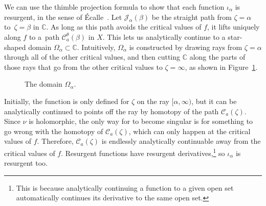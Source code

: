 \documentclass[pdftex]{sigma}
\newcommand{\C}{\mathbb{C}}
\numberwithin{equation}{section}
\begin{document}
\begin{Remark}
We can use the thimble projection formula to show that each function $\iota_\alpha$ is resurgent, in the sense of \'{E}calle~\cite[Section~1]{EcalleI}. Let $\mathcal{J}_\alpha(\beta)$ be the straight path from $\zeta = \alpha$ to~${\zeta = \beta}$ in $\C$. As long as this path avoids the critical values of $f$, it lifts uniquely along $f$ to a~path $\mathcal{C}_a^\theta(\beta)$ in $X$. This lets us analytically continue  to a star-shaped domain $\Omega_\alpha \subset \C$. Intuitively, $\Omega_\alpha$ is constructed by drawing rays from $\zeta = \alpha$ through all of the other critical values, and then cutting $\C$ along the parts of those rays that go from the other critical values to $\zeta = \infty$, as shown in Figure~\ref{Fig:slit domain}.
\begin{figure}[!ht]\centering\vspace{-2mm}


\vspace{-1mm}

\caption{The domain $\Omega_\alpha$.}\label{Fig:slit domain}
\end{figure}

Initially, the function  is only defined for $\zeta$ on the ray $[\alpha, \infty)$, but it can be analytically continued to points off the ray by homotopy of the path $\mathcal{C}_a(\zeta)$. Since $\nu$ is holomorphic, the only way for  to become singular is for something to go wrong with the homotopy of $\mathcal{C}_a(\zeta)$, which can only happen at the critical values of $f$. Therefore, $\mathcal{C}_a(\zeta)$ is endlessly analytically continuable away from the critical values of $f$. Resurgent functions have resurgent derivatives,\footnote{This is because analytically continuing a function to a given open set automatically continues its derivative to the same open set.} so $\iota_\alpha$ is resurgent too.
\end{Remark}
\end{document}
